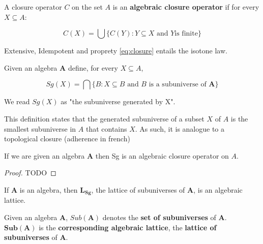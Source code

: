 \begin{definition} A closure operator $C$ on the set $A$ is
an \textbf{algebraic closure operator} if for every $X \subseteq A$:

	\begin{equation}
		\label{eq:closure} C(X) = \bigcup \{ C(Y) : Y \subseteq X \text{ and $Y$
is finite} \}
	\end{equation}
\end{definition}

\begin{remark} Extensive, Idempotent and proprety \ref{eq:closure} entails the
isotone law.
\end{remark}


\begin{definition} Given an algebra $\boldsymbol{A}$
define, for every $X \subseteq A$,

	\begin{equation} Sg(X) = \bigcap \{ B : X \subseteq B \text{ and $B$ is a
subuniverse of $\boldsymbol{A}$}\}
	\end{equation}

	We read $Sg(X)$ as "the subuniverse generated by X".
\end{definition}

\begin{remark} This definition states that the generated subuniverse of a subset
$X$ of $A$ is the smallest subuniverse in $A$ that contains $X$. As such, it is
analogue to a topological closure (adherence in french)
\end{remark}

\begin{theorem} If we are given an algebra $\boldsymbol{A}$ then Sg is an
algebraic closure operator on $A$.
\end{theorem}

\begin{proof}
	TODO
\end{proof}

\begin{corollary}
  If $\boldsymbol{A}$ is an algebra, then $\boldsymbol{L_{Sg}}$, the lattice of subuniverses of $\boldsymbol{A}$, is an algebraic lattice.
\end{corollary}

\begin{notation}
	Given an algebra $\boldsymbol{A}$, $Sub(\boldsymbol{A})$ denotes the \textbf{set of subuniverses} of $\boldsymbol{A}$. $\boldsymbol{Sub}(\boldsymbol{A})$ is the \textbf{corresponding algebraic lattice}, the \textbf{lattice of subuniverses} of $\boldsymbol{A}$.
\end{notation}

